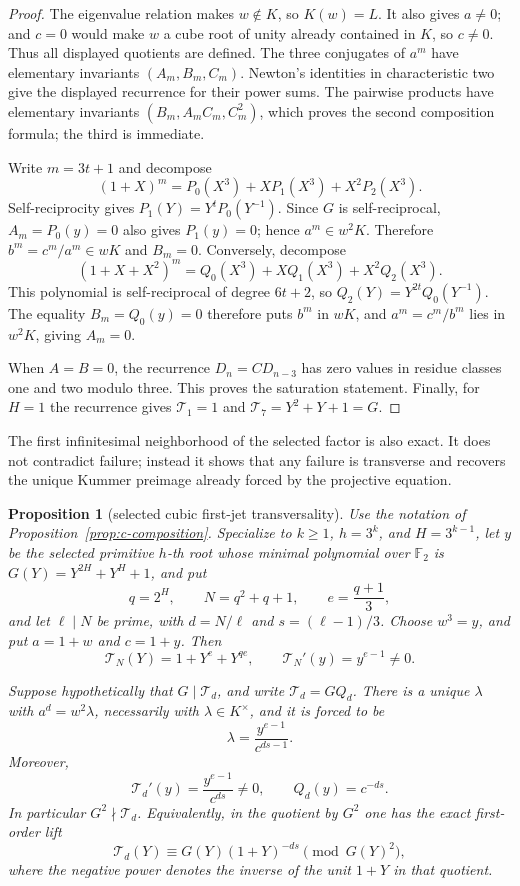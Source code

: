 \documentclass[11pt]{article}
\newtheorem{proposition}[theorem]{Proposition}
\theoremstyle{definition}
\theoremstyle{remark}
\begin{document}
\begin{proof}
The eigenvalue relation makes $w\notin K$, so $K(w)=L$.  It also gives
$a\ne0$; and $c=0$ would make $w$ a cube root of unity already contained in
$K$, so $c\ne0$.  Thus all displayed quotients are defined.
The three conjugates of $a^m$ have elementary invariants
$(A_m,B_m,C_m)$.  Newton's identities in characteristic two give the
displayed recurrence for their power sums.  The pairwise products have
elementary invariants $(B_m,A_mC_m,C_m^2)$, which proves the second
composition formula; the third is immediate.

Write $m=3t+1$ and decompose
\[
 (1+X)^m=P_0(X^3)+XP_1(X^3)+X^2P_2(X^3).
\]
Self-reciprocity gives $P_1(Y)=Y^tP_0(Y^{-1})$.  Since $G$ is
self-reciprocal, $A_m=P_0(y)=0$ also gives $P_1(y)=0$; hence
$a^m\in w^2K$.  Therefore $b^m=c^m/a^m\in wK$ and $B_m=0$.
Conversely, decompose
\[
 (1+X+X^2)^m=Q_0(X^3)+XQ_1(X^3)+X^2Q_2(X^3).
\]
This polynomial is self-reciprocal of degree $6t+2$, so
$Q_2(Y)=Y^{2t}Q_0(Y^{-1})$.  The equality $B_m=Q_0(y)=0$ therefore puts
$b^m$ in $wK$, and $a^m=c^m/b^m$ lies in $w^2K$, giving $A_m=0$.

When $A=B=0$, the recurrence $D_n=CD_{n-3}$ has zero values in residue
classes one and two modulo three.  This proves the saturation statement.
Finally, for $H=1$ the recurrence gives
$\mathcal T_1=1$ and $\mathcal T_7=Y^2+Y+1=G$.
\end{proof}

The first infinitesimal neighborhood of the selected factor is also exact.
It does not contradict failure; instead it shows that any failure is
transverse and recovers the unique Kummer preimage already forced by the
projective equation.

\begin{proposition}[selected cubic first-jet transversality]
\label{prop:c-first-jet}
Use the notation of Proposition~\ref{prop:c-composition}.  Specialize to
$k\geq1$, $h=3^k$, and $H=3^{k-1}$, let $y$ be the selected primitive
$h$-th root whose minimal polynomial over $\mathbb F_2$ is
$G(Y)=Y^{2H}+Y^H+1$, and put
\[
 q=2^H,\qquad N=q^2+q+1,\qquad e=\frac{q+1}{3},
\]
and let $\ell\mid N$ be prime, with
$d=N/\ell$ and $s=(\ell-1)/3$.  Choose $w^3=y$, and put
$a=1+w$ and $c=1+y$.  Then
\[
 \mathcal T_N(Y)=1+Y^e+Y^{qe},
 \qquad \mathcal T_N'(y)=y^{e-1}\ne0.
\]

Suppose hypothetically that $G\mid\mathcal T_d$, and write
$\mathcal T_d=GQ_d$.  There is a unique $\lambda$ with
$a^d=w^2\lambda$, necessarily with $\lambda\in K^\times$, and it is
forced to be
\[
 \lambda=\frac{y^{e-1}}{c^{ds-1}}.
\]
Moreover,
\[
 \mathcal T_d'(y)=\frac{y^{e-1}}{c^{ds}}\ne0,
 \qquad Q_d(y)=c^{-ds}.
\]
In particular $G^2\nmid\mathcal T_d$.  Equivalently, in the quotient by
$G^2$ one has the exact first-order lift
\[
 \mathcal T_d(Y)\equiv
 G(Y)(1+Y)^{-ds}\pmod {G(Y)^2},
\]
where the negative power denotes the inverse of the unit $1+Y$ in that
quotient.
\end{proposition}
\end{document}
